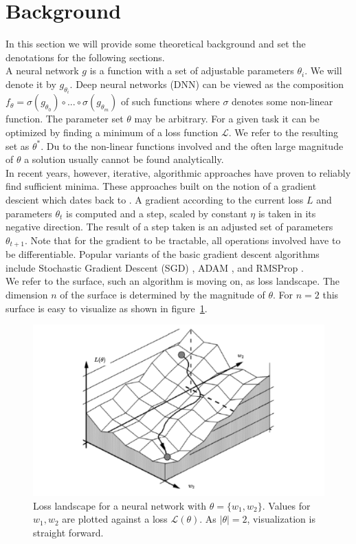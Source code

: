 \documentclass[a4paper]{scrartcl}
\begin{document}
\section*{Background}
In this section we will provide some theoretical background and set the denotations for the following sections.\\
A neural network $g$ is a function with a set of adjustable parameters $\theta_i$. We will denote it by $g_{\theta_i}$. Deep neural networks (DNN) can be viewed as the composition $f_{\theta} = \sigma (g_{\theta_0}) \circ ... \circ \sigma(g_{\theta_m})$ of such functions where $\sigma$ denotes some non-linear function. The parameter set $\theta$ may be arbitrary. For a given task it can be optimized by finding a minimum of a loss function $\mathcal{L}$. We refer to the resulting set as $\theta^*$. Du to the non-linear functions involved and the often large magnitude of $\theta$ a solution usually cannot be found analytically.\\
In recent years, however, iterative, algorithmic approaches have proven to reliably find sufficient minima. These approaches built on the notion of a gradient descient which dates back to \citet{cauchy1847methode}. A gradient according to the current loss $L$ and parameters $\theta_t$ is computed and a step, scaled by constant $\eta$ is taken in its negative direction. The result of a step taken is an adjusted set of parameters $\theta_{t+1}$. Note that for the gradient to be tractable, all operations involved have to be differentiable. Popular variants of the basic gradient descent algorithms include Stochastic Gradient Descent (SGD) \cite{robbins1951stochastic}, ADAM \cite{kingma2014adam}, and RMSProp \cite{graves2013generating}.\\
We refer to the surface, such an algorithm is moving on, as loss landscape. The dimension $n$ of the surface is determined by the magnitude of $\theta$. For $n=2$ this surface is easy to visualize as shown in figure~\ref{fig:twoweights}.


\begin{figure}
	\centering
	\includegraphics[width=.6\linewidth]{figures/two_weight_loss.pdf}
	\caption{Loss landscape for a neural network with $\theta = \lbrace w_1, w_2 \rbrace$. Values for $w_1, w_2$ are plotted against a loss $\mathcal{L}(\theta)$. As $|\theta| = 2$, visualization is straight forward.}
	\label{fig:twoweights}
\end{figure}
\end{document}
